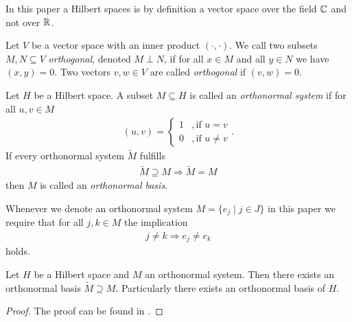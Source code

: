 In this paper a Hilbert spaces is by definition a vector space over the field $\mathbb{C}$ and not over $\mathbb{R}$. 

\begin{definition}
	Let $V$ be a vector space with an inner product $(\cdot, \cdot)$. We call two subsets $M,N \subseteq V$ \textit{orthogonal}, denoted $M \perp N$, if for all $x \in M$ and all $y \in N$ we have $(x,y) = 0$. Two vectors $v,w \in V$ are called \textit{orthogonal} if $(v,w) = 0$. 
\end{definition}

\begin{definition}
	Let $H$ be a Hilbert space. A subset $M \subseteq H$ is called an \textit{orthonormal system} if for all $u,v \in M$
	\begin{align*}
		(u,v) = 
		\begin{cases}
			1 &, \text{if } u = v \\
			0 &, \text{if } u \neq v
		\end{cases}.
	\end{align*}
	If every orthonormal system $\tilde{M}$ fulfills
	\begin{align*}
		\tilde{M} \supseteq M \Rightarrow \tilde{M} = M
	\end{align*}
	then $M$ is called an \textit{orthonormal basis}.
\end{definition}

\begin{remark}
	Whenever we denote an orthonormal system $M = \{e_j \mid j \in J\}$ in this paper we require that for all $j,k \in M$ the implication
	\begin{align*}
		j \neq k \Rightarrow e_j \neq e_k
	\end{align*}
	holds.
\end{remark}

\begin{lemma}\label{lemma:onb}
	Let $H$ be a Hilbert space and $M$ an orthonormal system. Then there exists an orthonormal basis $\tilde{M} \supseteq M$. Particularly there exists an orthonormal basis of $H$. 
\end{lemma}

\begin{proof}
	The proof can be found in \cite[p.52]{FAna1}.
\end{proof}

